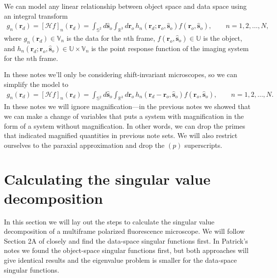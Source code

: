 \documentclass[11pt]{article}
\providecommand{\ro}[1]{\mathbf{\mathbf{r}}_o}
\providecommand{\so}[1]{\mathbf{\hat{s}}_o}
\providecommand{\rd}[1]{\mathbf{r}_d}
\providecommand{\mbb}[1]{\mathbb{#1}}
\begin{document}
We can model any linear relationship between object space and data space using
an integral transform
\begin{align}
  g_n(\rd{}) = [\mathcal{H}f]_n(\rd{}) = \int_{\mbb{S}^2}d\so{}\int_{\mbb{R}^3}d\ro{}\, h_n(\rd{}; \ro{}, \so{})f(\ro{}, \so{}),\qquad  n=1, 2,\ldots,N, \label{eq:full}
\end{align}
where $g_n(\rd{}) \in \mbb{V}_n$ is the data for the $n$th frame,
$f(\ro{}, \so{}) \in \mbb{U}$ is the object, and
$h_n(\rd{}; \ro{}, \so{}) \in \mbb{U} \times \mbb{V}_n$ is the point response
function of the imaging system for the $n$th frame.

In these notes we'll only be considering shift-invariant microscopes, so we can
simplify the model to
\begin{align}
  g_n(\rd{}) = [\mathcal{H}f]_n(\rd{}) = \int_{\mbb{S}^2}d\so{}\int_{\mbb{R}^3}d\ro{}\, h_n(\rd{} - \ro{}, \so{})f(\ro{}, \so{}),\qquad  n=1, 2,\ldots,N. \label{eq:full}
\end{align}
In these notes we will ignore magnification---in the previous notes we showed
that we can make a change of variables that puts a system with magnification in
the form of a system without magnification. In other words, we can drop the
primes that indicated magnified quantities in previous note sets. We will also
restrict ourselves to the paraxial approximation and drop the $(p)$
superscripts.

\section{Calculating the singular value decomposition}
In this section we will lay out the steps to calculate the singular value
decomposition of a multiframe polarized fluorescence microscope. We will follow
Section 2A of \cite{burvall06} closely and find the data-space singular
functions first. In Patrick's notes we found the object-space singular functions
first, but both approaches will give identical results and the eigenvalue
problem is smaller for the data-space singular functions.
\end{document}
